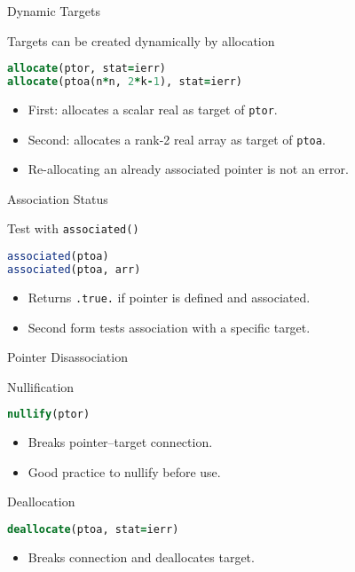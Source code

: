 \begin{frame}[fragile]{Dynamic Targets}

  \begin{block}{Targets can be created dynamically by allocation}
\begin{lstlisting}[language=Fortran]
allocate(ptor, stat=ierr)
allocate(ptoa(n*n, 2*k-1), stat=ierr)
\end{lstlisting}
    \begin{itemize}
      \item First: allocates a scalar real as target of \texttt{ptor}.
      \item Second: allocates a rank-2 real array as target of \texttt{ptoa}.
      \item Re-allocating an already associated pointer is not an error.
    \end{itemize}
  \end{block}
\end{frame}

\begin{frame}[fragile]{Association Status}
  \begin{block}{Test with \texttt{associated()}}
\begin{lstlisting}[language=Fortran]
associated(ptoa)
associated(ptoa, arr)
\end{lstlisting}
    \begin{itemize}
      \item Returns \texttt{.true.} if pointer is defined and associated.
      \item Second form tests association with a specific target.
    \end{itemize}
  \end{block}
\end{frame}

\begin{frame}[fragile]{Pointer Disassociation}
  \begin{block}{Nullification}
\begin{lstlisting}[language=Fortran]
nullify(ptor)
\end{lstlisting}
    \begin{itemize}
      \item Breaks pointer–target connection.
      \item Good practice to nullify before use.
    \end{itemize}
  \end{block}

  \begin{block}{Deallocation}
\begin{lstlisting}[language=Fortran]
deallocate(ptoa, stat=ierr)
\end{lstlisting}
    \begin{itemize}
      \item Breaks connection and deallocates target.
    \end{itemize}
  \end{block}
\end{frame}

